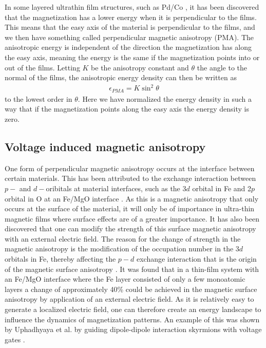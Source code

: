 \documentclass[12pt, a4paper, twoside, openright]{report}
\numberwithin{equation}{chapter}
\numberwithin{figure}{chapter}
\numberwithin{table}{chapter}
\begin{document}
In some layered ultrathin film structures, such as Pd/Co \cite{Carcia1985}, it has been discovered that the magnetization has a lower energy when it is perpendicular to the films. This means that the easy axis of the material is perpendicular to the films, and we then have something called perpendicular magnetic anisotropy (PMA). The anisotropic energy is independent of the direction the magnetization has along the easy axis, meaning the energy is the same if the magnetization points into or out of the films. Letting $K$ be the anisotropy constant and $\theta$ the angle to the normal of the films, the anisotropic energy density can then be written as
\begin{align}
\epsilon_{PMA} = K\sin^2\theta \label{eq:PMADensity}
\end{align} 
to the lowest order in $\theta$. Here we have normalized the energy density in such a way that if the magnetization points along the easy axis the energy density is zero.

\subsection{Voltage induced magnetic anisotropy} \label{sec:VIMA}
One form of perpendicular magnetic anisotropy occurs at the interface between certain materials. This has been attributed to the exchange interaction between $p-$ and $d-$oribitals at material interfaces, such as the 3$d$ orbital in Fe and 2$p$ orbital in O at an Fe/MgO interface \cite{Matsukura2015}. As this is a magnetic anisotropy that only occurs at the surface of the material, it will only be of importance in ultra-thin magnetic films where surface effects are of a greater importance. It has also been discovered that one can modify the strength of this surface magnetic anisotropy with an external electric field. The reason for the change of strength in the magnetic anisotropy is the modification of the occupation number in the 3$d$ orbitals in Fe, thereby affecting the $p-d$ exchange interaction that is the origin of the magnetic surface anisotropy \cite{Maruyama2009}. It was found that in a thin-film system with an Fe/MgO interface where the Fe layer consisted of only a few monoatomic layers a change of approximately 40\% could be achieved in the magnetic surface anisotropy by application of an external electric field. As it is relatively easy to generate a localized electric field, one can therefore create an energy landscape to influence the dynamics of magnetization patterns. An example of this was shown by Uphadhyaya et al. by guiding dipole-dipole interaction skyrmions with voltage gates \cite{Upadhyaya2015}.
\end{document}

